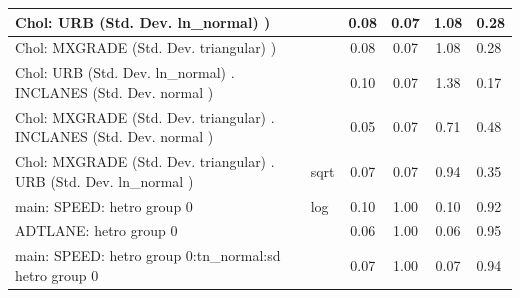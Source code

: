 \begin{table}
\begin{center}
\begin{tabular}{|l|l|c|c|c|l|}
			\hline
			 Chol: URB (Std. Dev. ln_normal) ) &  & 0.08 & 0.07 & 1.08 & 0.28 \\
			\hline
			 Chol: MXGRADE (Std. Dev. triangular) ) &  & 0.08 & 0.07 & 1.08 & 0.28 \\
			\hline
			 Chol: URB (Std. Dev. ln_normal) . INCLANES (Std. Dev.   normal ) &  & 0.10 & 0.07 & 1.38 & 0.17 \\
			\hline
			 Chol: MXGRADE (Std. Dev. triangular) . INCLANES (Std. Dev.   normal ) &  & 0.05 & 0.07 & 0.71 & 0.48 \\
			\hline
			 Chol: MXGRADE (Std. Dev. triangular) . URB (Std. Dev.   ln_normal ) & sqrt & 0.07 & 0.07 & 0.94 & 0.35 \\
			\hline
			main: SPEED: hetro group 0 & log & 0.10 & 1.00 & 0.10 & 0.92 \\
			\hline
			ADTLANE: hetro group 0 &  & 0.06 & 1.00 & 0.06 & 0.95 \\
			\hline
			main: SPEED: hetro group 0:tn_normal:sd  hetro group 0 &  & 0.07 & 1.00 & 0.07 & 0.94 \\
			\hline
		\end{tabular}
	\end{center}
\end{table}